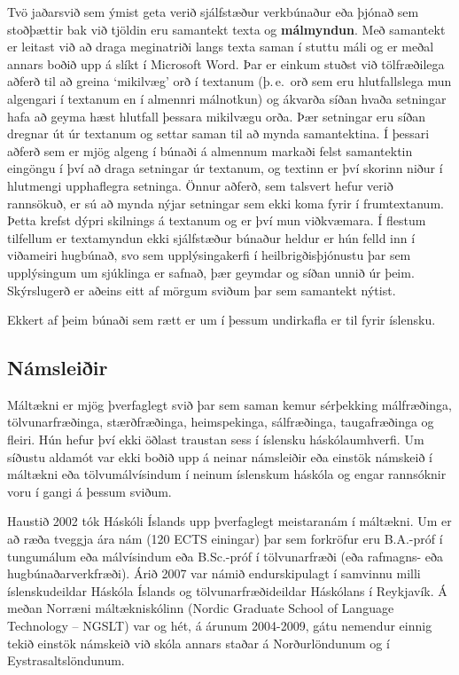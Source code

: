 \documentclass{../../metanetpaper}
\begin{document}
\begin{multicols}{2}

Tvö jaðarsvið sem ýmist geta verið sjálfstæður verkbúnaður eða þjónað sem stoðþættir bak við tjöldin eru samantekt texta og \textbf{málmyndun}. Með samantekt er leitast við að draga meginatriði langs texta saman í stuttu máli og er meðal annars boðið upp á slíkt í Microsoft Word. Þar er einkum stuðst við tölfræðilega aðferð til að greina ‘mikilvæg’ orð í textanum (þ.\,e.~orð sem eru hlutfallslega mun algengari í textanum en í almennri málnotkun) og ákvarða síðan hvaða setningar hafa að geyma hæst hlutfall þessara mikilvægu orða. Þær setningar eru síðan dregnar út úr textanum og settar saman til að mynda samantektina. Í þessari aðferð sem er mjög algeng í búnaði á almennum markaði felst samantektin eingöngu í því að draga setningar úr textanum, og textinn er því skorinn niður í hlutmengi upphaflegra setninga. Önnur aðferð, sem talsvert hefur verið rannsökuð, er sú að mynda nýjar setningar sem ekki koma fyrir í frumtextanum. Þetta krefst dýpri skilnings á textanum og er því mun viðkvæmara. Í flestum tilfellum er textamyndun ekki sjálfstæður búnaður heldur er hún felld inn í viðameiri hugbúnað, svo sem upplýsingakerfi í heilbrigðisþjónustu þar sem upplýsingum um sjúklinga er safnað, þær geymdar og síðan unnið úr þeim. Skýrslugerð er aðeins eitt af mörgum sviðum þar sem samantekt nýtist.

Ekkert af þeim búnaði sem rætt er um í þessum undirkafla er til fyrir íslensku.

\subsection{Námsleiðir}

Máltækni er mjög þverfaglegt svið þar sem saman kemur sérþekking málfræðinga, tölvunarfræðinga, stærðfræðinga, heimspekinga, sálfræðinga, taugafræðinga og fleiri. Hún hefur því ekki öðlast traustan sess í íslensku háskólaumhverfi. Um síðustu aldamót var ekki boðið upp á neinar námsleiðir eða einstök námskeið í máltækni eða tölvumálvísindum í neinum íslenskum háskóla og engar rannsóknir voru í gangi á þessum sviðum. 

Haustið 2002 tók Háskóli Íslands upp þverfaglegt meistaranám í máltækni. Um er að ræða tveggja ára nám (120 ECTS einingar) þar sem forkröfur eru B.A.-próf í tungumálum eða málvísindum eða B.Sc.-próf í tölvunarfræði (eða rafmagns- eða hugbúnaðarverkfræði). Árið 2007 var námið endurskipulagt í samvinnu milli íslenskudeildar Háskóla Íslands og tölvunarfræðideildar Háskólans í Reykjavík. Á meðan Norræni máltækniskólinn (Nordic Graduate School of Language Technology -- NGSLT) var og hét, á árunum 2004-2009, gátu nemendur einnig tekið einstök námskeið við skóla annars staðar á Norðurlöndunum og í Eystrasaltslöndunum.


\end{multicols}
\end{document}
